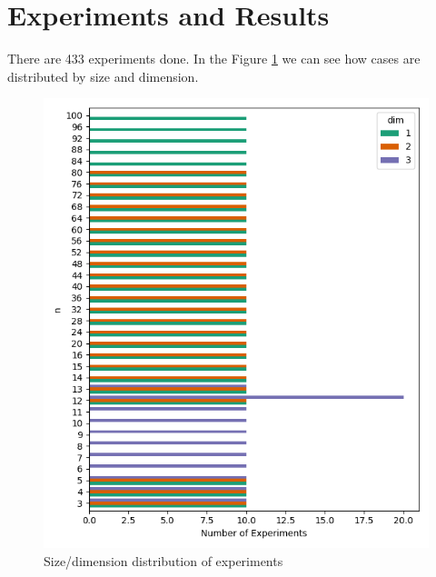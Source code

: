\documentclass{article}
\begin{document}
\section{Experiments and Results}
\par There are 433 experiments done. In the Figure \ref{fig:cases_distribution} we can see how cases are distributed by size and dimension.
\begin{figure}[ht]
  \centering
  \includegraphics[width=\textwidth]{pics/torus scores/cases.png}
  \caption{Size/dimension distribution of experiments}
  \label{fig:cases_distribution}
\end{figure}
\end{document}
